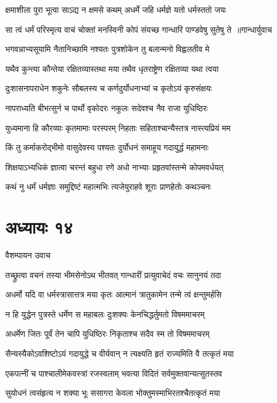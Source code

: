 \twolineshloka
{क्षमाशीला पुरा भूत्वा साऽद्य न क्षमसे कथम्}
{अधर्मे जहि धर्मज्ञे यतो धर्मस्ततो जयः}


\threelineshloka
{सा त्वं धर्मं परिस्मृत्य वाचं चोक्तां मनस्विनी}
{कोपं संयच्छ गान्धारि पाण्डवेषु सुतेषु ते ॥गान्धार्युवाच}
{}


\twolineshloka
{भगवन्नाभ्यसूयामि नैतानिच्छामि नश्यतः}
{पुत्रशोकेन तु बलान्मनो विह्वलतीव मे}


\twolineshloka
{यथैव कुन्त्या कौन्तेया रक्षितव्यास्तथा मया}
{तथैव धृतराष्ट्रेण रक्षितव्या यथा त्वया}


\twolineshloka
{दुःशासनापराधेन शकुनेः सौबलस्य च}
{कर्णदुर्योधनाभ्यां च कृतोऽयं कृरुसंक्षयः}


\twolineshloka
{नापराध्यति बीभत्सुर्न च पार्थो वृकोदरः}
{नकुलः सदेवश्च नैव राजा युधिष्ठिरः}


\twolineshloka
{युध्यमाना हि कौरव्याः कृतमामाः परस्परम्}
{निहताः सहिताश्चान्यैस्तत्र नास्त्यप्रियं मम}


\twolineshloka
{किं तु कर्माकरोद्भीमो वासुदेवस्य पश्यतः}
{दुर्योधनं समाहूय गदायुर्द्ध महामनाः}


\twolineshloka
{शिक्षयाऽभ्यधिकं ज्ञात्वा चरन्तं बहुधा रणे}
{अधो नाभ्याः प्रहृतवांस्तन्मे कोपमवर्धयत्}


\twolineshloka
{कथं नु धर्मं धर्मज्ञाः समुद्दिष्टं महात्मभिः}
{त्यजेयुराहवे शूराः प्राणहेतोः कथञ्चनः}


\chapter{अध्यायः १४}
\twolineshloka
{वैशम्पायन उवाच}
{}


\twolineshloka
{तच्छ्रुत्वा वचनं तस्या भीमसेनोऽथ भीतवत्}
{गान्धारीं प्रत्युवाचेदं वचः सानुनयं तदा}


\twolineshloka
{अधर्मो यदि वा धर्मस्त्रासात्तत्र मया कृतः}
{आत्मानं त्रातुकामेन तन्मे त्वं क्षन्तुमर्हसि}


\twolineshloka
{न हि युद्धेन पुत्रस्ते धर्मेण स महाबलः}
{दुःशक्यः केनचिद्धर्तुमतो विषममाचरम्}


\twolineshloka
{अधर्मेण जितः पूर्वं तेन चापि युधिष्ठिरः}
{निकृताश्च सदैव स्म तो विषममाचरम्}


\twolineshloka
{सैन्यस्यैकोऽवशिष्टोऽयं गदायुद्धे च वीर्यवान्}
{न त्यक्ष्यति हृतं राज्यमिति वै तत्कृतं मया}


\twolineshloka
{एकपत्नीं च पाश्चालीमेकवस्त्रां रजस्वलाम्}
{भवत्या विदितं सर्वमुक्तवान्यत्सुतस्तव}


\twolineshloka
{सुयोधनं त्वसंहृत्य न शक्या भूः ससागरा}
{केवला भोक्तुमस्माभिरतश्चैतत्कृतं मया}


